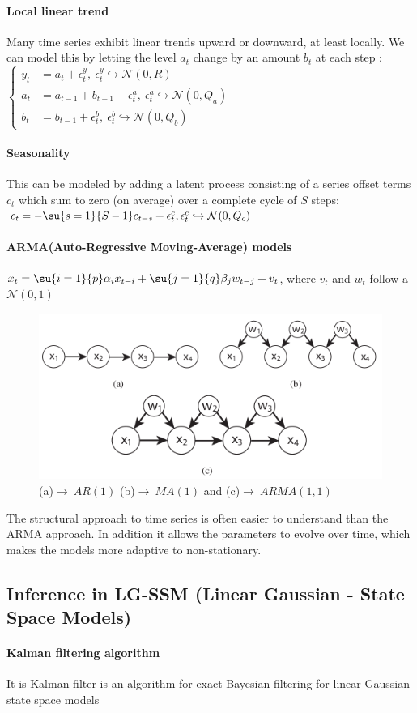 \paragraph{Local linear trend}
Many time series exhibit linear trends upward or downward, at least locally. We can model this by
letting the level $a_{t}$ change by an amount $b_{t}$ at each step :
$\begin{cases}
    y_{t} &= a_{t} + \epsilon^{y}_{t},~\epsilon^{y}_{t}\hookrightarrow \mathcal{N}(0, R)\\
    a_{t} &= a_{t-1} + b_{t-1} + \epsilon^{a}_{t},~\epsilon^{a}_{t}\hookrightarrow \mathcal{N}(0, 
    Q_{a})\\
    b_{t} &= b_{t-1} + \epsilon^{b}_{t},~\epsilon^{b}_{t}\hookrightarrow \mathcal{N}(0, Q_{b})
\end{cases}$
\paragraph{Seasonality}
This can be modeled by adding a latent process consisting of a series offset terms $c_{t}$ which
sum to zero (on average) over a complete cycle of $S$ steps:
$c_{t} = -\su{s=1}{S-1}c_{t-s}+\epsilon^{c}_{t}, \epsilon^{c}_{t}\hookrightarrow\mathcal{N}(0, 
Q_{c})$

\paragraph{ARMA(Auto-Regressive Moving-Average) models}
$x_{t} = \su{i=1}{p}\alpha_{i}x_{t-i} + \su{j=1}{q}\beta_{j}w_{t-j}+v_{t}$, where $v_{t}$ and $w_{t}$
follow a $\mathcal{N}(0, 1)$
\begin{figure}[H]
    \begin{center}
        \includegraphics[width=.5\textwidth]{./chapters/2_statistics/07_hidden_markov_models/2_images/1_arma_graph.png}
    \end{center}
    \caption{(a)$\rightarrow~AR(1)$ (b)$\rightarrow~MA(1)$ and (c)$\rightarrow~ARMA(1,1)$}
    \label{fig:1_arma_graph}
\end{figure}
The structural approach to time series is often easier to understand than the ARMA approach.
In addition it allows the parameters to evolve over time, which makes the models more adaptive to 
non-stationary.

\subsection{Inference in LG-SSM (Linear Gaussian - State Space Models)}
\paragraph{Kalman filtering algorithm}
It is Kalman filter is an algorithm for exact Bayesian filtering for linear-Gaussian state space 
models

